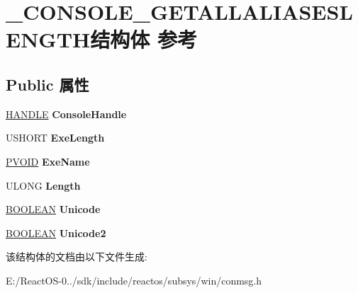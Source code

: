 \hypertarget{struct___c_o_n_s_o_l_e___g_e_t_a_l_l_a_l_i_a_s_e_s_l_e_n_g_t_h}{}\section{\+\_\+\+C\+O\+N\+S\+O\+L\+E\+\_\+\+G\+E\+T\+A\+L\+L\+A\+L\+I\+A\+S\+E\+S\+L\+E\+N\+G\+T\+H结构体 参考}
\label{struct___c_o_n_s_o_l_e___g_e_t_a_l_l_a_l_i_a_s_e_s_l_e_n_g_t_h}
\subsection*{Public 属性}
\begin{DoxyCompactItemize}
\item 
\mbox{\label{struct___c_o_n_s_o_l_e___g_e_t_a_l_l_a_l_i_a_s_e_s_l_e_n_g_t_h_a73cf322549833720fd18122408577008}} 
\hyperlink{interfacevoid}{H\+A\+N\+D\+LE} {\bfseries Console\+Handle}
\item 
\mbox{\label{struct___c_o_n_s_o_l_e___g_e_t_a_l_l_a_l_i_a_s_e_s_l_e_n_g_t_h_a31493f33c6bfc10a636dd8347e13c6fa}} 
U\+S\+H\+O\+RT {\bfseries Exe\+Length}
\item 
\mbox{\label{struct___c_o_n_s_o_l_e___g_e_t_a_l_l_a_l_i_a_s_e_s_l_e_n_g_t_h_abe32e03b10c3d8366a248b32382e2c60}} 
\hyperlink{interfacevoid}{P\+V\+O\+ID} {\bfseries Exe\+Name}
\item 
\mbox{\label{struct___c_o_n_s_o_l_e___g_e_t_a_l_l_a_l_i_a_s_e_s_l_e_n_g_t_h_a7f1f43b66182b83d677bc5caffaecd85}} 
U\+L\+O\+NG {\bfseries Length}
\item 
\mbox{\label{struct___c_o_n_s_o_l_e___g_e_t_a_l_l_a_l_i_a_s_e_s_l_e_n_g_t_h_aafe77915b29b441f0ac3f1749d1f2981}} 
\hyperlink{_processor_bind_8h_a112e3146cb38b6ee95e64d85842e380a}{B\+O\+O\+L\+E\+AN} {\bfseries Unicode}
\item 
\mbox{\label{struct___c_o_n_s_o_l_e___g_e_t_a_l_l_a_l_i_a_s_e_s_l_e_n_g_t_h_a655bf4dbc986769fadc019d705f3edaf}} 
\hyperlink{_processor_bind_8h_a112e3146cb38b6ee95e64d85842e380a}{B\+O\+O\+L\+E\+AN} {\bfseries Unicode2}
\end{DoxyCompactItemize}


该结构体的文档由以下文件生成\+:\begin{DoxyCompactItemize}
\item 
E\+:/\+React\+O\+S-\/0../sdk/include/reactos/subsys/win/conmsg.\+h\end{DoxyCompactItemize}
